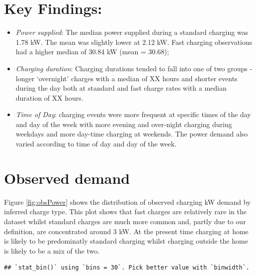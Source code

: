\documentclass[]{article}
\providecommand{\tightlist}{%
  \setlength{\itemsep}{0pt}\setlength{\parskip}{0pt}}
\begin{document}
\section{Key Findings:}\label{key-findings}

\begin{itemize}
\tightlist
\item
  \emph{Power supplied}: The median power supplied during a standard
  charging was 1.78 kW. The mean was slightly lower at 2.12 kW. Fast
  charging observations had a higher median of 30.84 kW (mean = 30.68);
\item
  \emph{Charging duration}: Charging durations tended to fall into one
  of two groups - longer `overnight' charges with a median of XX hours
  and shorter events during the day both at standard and fast charge
  rates with a median duration of XX hours.
\item
  \emph{Time of Day}: charging events were more frequent at specific
  times of the day and day of the week with more evening and over-night
  charging during weekdays and more day-time charging at weekends. The
  power demand also varied according to time of day and day of the week.
\end{itemize}

\section{Observed demand}\label{observed-demand}

Figure \ref{fig:obsPower} shows the distribution of observed charging kW
demand by inferred charge type. This plot shows that fast charges are
relatively rare in the dataset whilst standard charges are much more
common and, partly due to our definition, are concentrated around 3 kW.
At the present time charging at home is likely to be predominatly
standard charging whilst charging outside the home is likely to be a mix
of the two.

\begin{verbatim}
## `stat_bin()` using `bins = 30`. Pick better value with `binwidth`.
\end{verbatim}
\end{document}
